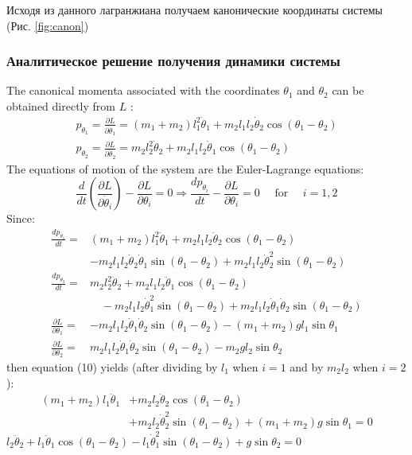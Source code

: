 \documentclass[12pt]{article}
\begin{document}
	Исходя из данного лагранжиана получаем канонические координаты системы (Рис. \ref{fig:canon})

	\subsubsection{Аналитическое решение получения динамики системы}
	The canonical momenta associated with the coordinates $\theta_{1}$ and $\theta_{2}$ can be obtained directly from $L$ :
	$$
	\begin{array}{l}
	p_{\theta_{1}}=\frac{\partial L}{\partial \dot{\theta}_{1}}=\left(m_{1}+m_{2}\right) l_{1}^{2} \dot{\theta}_{1}+m_{2} l_{1} l_{2} \dot{\theta}_{2} \cos \left(\theta_{1}-\theta_{2}\right) \\
	p_{\theta_{2}}=\frac{\partial L}{\partial \dot{\theta}_{2}}=m_{2} l_{2}^{2} \dot{\theta}_{2}+m_{2} l_{1} l_{2} \dot{\theta}_{1} \cos \left(\theta_{1}-\theta_{2}\right)
	\end{array}
	$$
	The equations of motion of the system are the Euler-Lagrange equations:
	$$
	\frac{d}{d t}\left(\frac{\partial L}{\partial \dot{\theta}_{i}}\right)-\frac{\partial L}{\partial \theta_{i}}=0 \Longrightarrow \frac{d p_{\theta_{i}}}{d t}-\frac{\partial L}{\partial \theta_{i}}=0 \quad \text { for } \quad i=1,2
	$$
	Since:
	$$
	\begin{aligned}
	\frac{d p_{\theta_{1}}}{d t}=&\left(m_{1}+m_{2}\right) l_{1}^{2} \ddot{\theta}_{1}+m_{2} l_{1} l_{2} \ddot{\theta}_{2} \cos \left(\theta_{1}-\theta_{2}\right) \\
	&-m_{2} l_{1} l_{2} \dot{\theta}_{2} \dot{\theta}_{1} \sin \left(\theta_{1}-\theta_{2}\right)+m_{2} l_{1} l_{2} \dot{\theta}_{2}^{2} \sin \left(\theta_{1}-\theta_{2}\right) \\
	\frac{d p_{\theta_{2}}}{d t}=& m_{2} l_{2}^{2} \ddot{\theta}_{2}+m_{2} l_{1} l_{2} \ddot{\theta}_{1} \cos \left(\theta_{1}-\theta_{2}\right) \\
	& \quad-m_{2} l_{1} l_{2} \dot{\theta}_{1}^{2} \sin \left(\theta_{1}-\theta_{2}\right)+m_{2} l_{1} l_{2} \dot{\theta}_{1} \dot{\theta}_{2} \sin \left(\theta_{1}-\theta_{2}\right) \\
	\frac{\partial L}{\partial \theta_{1}}=&-m_{2} l_{1} l_{2} \dot{\theta}_{1} \dot{\theta}_{2} \sin \left(\theta_{1}-\theta_{2}\right)-\left(m_{1}+m_{2}\right) g l_{1} \sin \theta_{1} \\
	\frac{\partial L}{\partial \theta_{2}}=& m_{2} l_{1} l_{2} \dot{\theta}_{1} \dot{\theta}_{2} \sin \left(\theta_{1}-\theta_{2}\right)-m_{2} g l_{2} \sin \theta_{2}
	\end{aligned}
	$$
	then equation (10) yields (after dividing by $l_{1}$ when $i=1$ and by $m_{2} l_{2}$ when $i=2$ ):
	$$
	\begin{aligned}
	\left(m_{1}+m_{2}\right) l_{1} \ddot{\theta}_{1} &+m_{2} l_{2} \ddot{\theta}_{2} \cos \left(\theta_{1}-\theta_{2}\right) \\
	&+m_{2} l_{2} \dot{\theta}_{2}^{2} \sin \left(\theta_{1}-\theta_{2}\right)+\left(m_{1}+m_{2}\right) g \sin \theta_{1}=0
	\end{aligned}
	$$
	$l_{2} \ddot{\theta}_{2}+l_{1} \ddot{\theta}_{1} \cos \left(\theta_{1}-\theta_{2}\right)-l_{1} \dot{\theta}_{1}^{2} \sin \left(\theta_{1}-\theta_{2}\right)+g \sin \theta_{2}=0$
	
\end{document}
